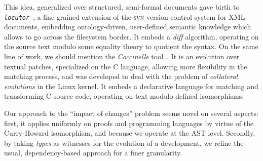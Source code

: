 \documentclass{article}
\newcommand{\remtext}[1]{\textcolor{bwgreen}{$\triangleright$ \textsl{#1}}}
\renewcommand{\remtext}[1]{}
\begin{document}
This idea, generalized over structured, semi-formal documents gave
birth to \texttt{\it locutor}~\citep{muller2008fine}, a fine-grained
extension of the \textsc{svn} version control system for XML
documents, embedding ontology-driven, user-defined semantic knowledge
which allows to go across the filesystem border. It embeds a
\emph{diff} algorithm, operating on the source text modulo some
equality theory to quotient the syntax. On the same line of work, we
should mention the \emph{Coccinelle}
tool~\citep{padioleau2008documenting}. It is an evolution over textual
patches, specialized on the C language, allowing more flexibility in
the matching process, and was developed to deal with the problem of
\emph{collateral evolutions} in the Linux kernel. It embeds a
declarative language for matching and transforming C source code,
operating on text modulo defined isomorphisms.

Our approach to the ``impact of changes'' problem seems novel on
several aspects: first, it applies uniformly on proofs and programming
languages by virtue of the Curry-Howard isomorphism, and because we
operate at the AST level. Secondly, by taking \emph{types} as 
witnesses for the evolution of a development, we refine the usual,
dependency-based approach for a finer granularity.







\end{document}
